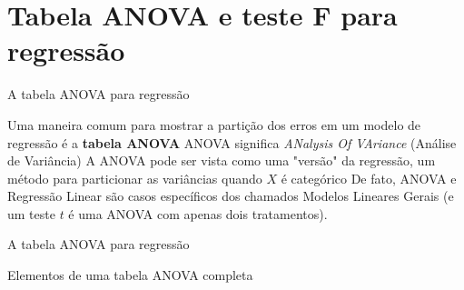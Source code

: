 \documentclass{beamer}\usepackage[]{graphicx}\usepackage[]{color}
\begin{document}

\section{Tabela ANOVA e teste F para regressão}


\begin{frame}{A tabela ANOVA para regressão}

Uma maneira comum para mostrar a partição dos erros em um modelo de regressão é a \textbf{tabela ANOVA} \pause
\vfill
ANOVA significa \emph{ANalysis Of VAriance} (Análise de Variância) \pause
\vfill
A ANOVA pode ser vista como uma "versão" da regressão, um método para particionar as variâncias quando $X$ é categórico \pause
\vfill
De fato, ANOVA e Regressão Linear são casos específicos dos chamados Modelos Lineares Gerais (e um teste $t$ é uma ANOVA com apenas dois tratamentos).

\end{frame}


\begin{frame}{A tabela ANOVA para regressão}

Elementos de uma tabela ANOVA completa
\vfill


\end{frame}
\end{document}
